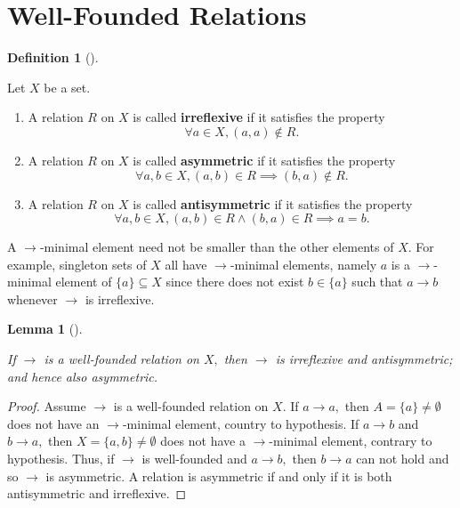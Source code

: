 \documentclass[
  letterpaper,
  10pt,
  reqno,
  twopage,
  openany]{book}
\providecommand{\tightlist}{%
  \setlength{\itemsep}{0pt}\setlength{\parskip}{0pt}}\usepackage{longtable,booktabs,array}
\theoremstyle{plain}
\newtheorem{lemma}{Lemma}[chapter]
\theoremstyle{definition}
\theoremstyle{definition}
\newtheorem{definition}{Definition}[chapter]
\theoremstyle{definition}
\theoremstyle{plain}
\theoremstyle{plain}
\theoremstyle{remark}
\begin{document}
\hypertarget{well-founded-relations}{%
\section{Well-Founded Relations}\label{well-founded-relations}}

\leavevmode{}%
\begin{definition}[]\label{def-irreflexive-asymmetric-antisymmetric}

Let \(X\) be a set.

\begin{enumerate}
\def\labelenumi{\arabic{enumi}.}
\tightlist
\item
  A relation \(R\) on \(X\) is called 
  \textbf{irreflexive} if it satisfies the property
  \[\forall a\in X, (a,a)\notin R.\]
\item
  A relation \(R\) on \(X\) is called 
  \textbf{asymmetric} if it satisfies the property
  \[\forall a,b\in X, (a,b)\in R \implies (b,a)\notin R.\]
\item
  A relation \(R\) on \(X\) is called 
  \textbf{antisymmetric} if it satisfies the property \[
  \forall a,b\in X, (a,b)\in R \land (b,a)\in R\implies a=b.\]
\end{enumerate}

\end{definition}

A \(\longrightarrow\)-minimal element need not be smaller than the other
elements of \(X.\) For example, singleton sets of \(X\) all have
\(\longrightarrow\)-minimal elements, namely \(a\) is a
\(\longrightarrow\)-minimal element of \(\{a\}\subseteq X\) since there
does not exist \(b\in\{a\}\) such that \(a\longrightarrow b\) whenever
\(\longrightarrow\) is irreflexive.

\leavevmode{}%
\begin{lemma}[]\label{lem-well-founded-irreflexive-antisymmetric}

If \(\longrightarrow\) is a well-founded relation on \(X,\) then
\(\longrightarrow\) is irreflexive and antisymmetric; and hence also
asymmetric.

\end{lemma}

\begin{proof}

Assume \(\longrightarrow\) is a well-founded relation on \(X.\) If
\(a\longrightarrow a,\) then \(A=\{a\}\neq\emptyset\) does not have an
\(\longrightarrow\)-minimal element, country to hypothesis. If
\(a\longrightarrow b\) and \(b\longrightarrow a,\) then
\(X=\{a,b\}\neq\emptyset\) does not have a \(\longrightarrow\)-minimal
element, contrary to hypothesis. Thus, if \(\longrightarrow\) is
well-founded and \(a\longrightarrow b,\) then \(b\longrightarrow a\) can
not hold and so \(\longrightarrow\) is asymmetric. A relation is
asymmetric if and only if it is both antisymmetric and irreflexive.

\end{proof}
\end{document}

